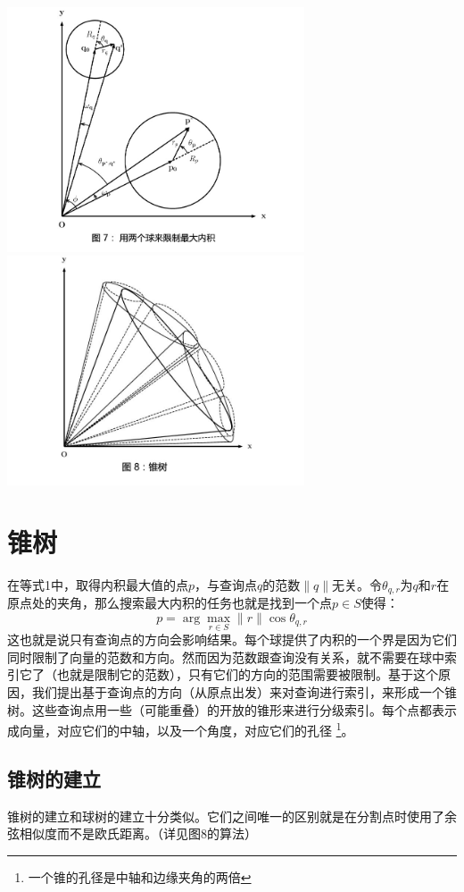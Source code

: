 \documentclass[twocolumn]{article}
\begin{document}
\includegraphics[width=250pt,clip,trim=20 0 0 0]{fig07.jpg}
\includegraphics[width=250pt,clip,trim=0 0 0 0]{fig08.jpg}

\section{锥树}
在等式1中，取得内积最大值的点$p$，与查询点$q$的范数$\|q\|$无关。令$\theta_{q,r}$为$q$和$r$在原点处的夹角，那么搜索最大内积的任务也就是找到一个点$p \in S$使得：
\begin{equation}
p = \arg \max_{r \in S}\|r\|\cos\theta_{q,r}
\end{equation}
这也就是说只有查询点的方向会影响结果。每个球提供了内积的一个界是因为它们同时限制了向量的范数和方向。然而因为范数跟查询没有关系，就不需要在球中索引它了（也就是限制它的范数），只有它们的方向的范围需要被限制。基于这个原因，我们提出基于查询点的方向（从原点出发）来对查询进行索引，来形成一个锥树。这些查询点用一些（可能重叠）的开放的锥形来进行分级索引。每个点都表示成向量，对应它们的中轴，以及一个角度，对应它们的孔径
\footnote{一个锥的孔径是中轴和边缘夹角的两倍}。
\subsection{锥树的建立}
锥树的建立和球树的建立十分类似。它们之间唯一的区别就是在分割点时使用了余弦相似度而不是欧氏距离。（详见图8的算法）
\end{document}
